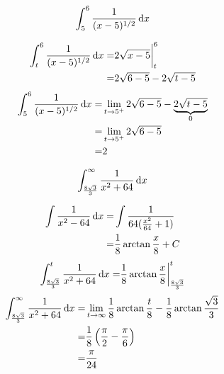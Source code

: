 \begin{ex}
  \[ \int^6_5 \frac{1}{(x-5)^{1/2}}\,\mathrm{d} x \]
  \begin{sol}
    \begin{align*}
      \int^6_t \frac{1}{(x-5)^{1/2}}\,\mathrm{d} x
      =& 2 \sqrt{x-5}\bigg|^6_t \\
      =& 2 \sqrt{6-5}-2\sqrt{t-5}
    \end{align*}
    \begin{align*}
      \int^6_5 \frac{1}{(x-5)^{1/2}}\,\mathrm{d} x
      =& \lim_{t \to 5^+} 2\sqrt{6-5}-\underbrace{2\sqrt{t-5}}_{0} \\
      =& \lim_{t \to 5^+} 2\sqrt{6-5}\\
      =& 2
    \end{align*}
  \end{sol}
\end{ex}
\begin{ex}
  \[ \int^\infty_{\frac{8\sqrt 3}{3}}\frac{1}{x^2+64}\,\mathrm{d} x \]
  \begin{sol}
    \begin{align*}
      \int \frac{1}{x^2-64}\,\mathrm{d} x
      =& \int \frac{1}{64(\frac{x^2}{64}+1)} \\
      =&\frac{1}{8}\arctan{\frac{x}{8}} + C
    \end{align*}
    \begin{align*}
      \int^t_{\frac{8\sqrt 3}{3}}\frac{1}{x^2+64}\,\mathrm{d} x
      =&\frac{1}{8}\arctan{\frac{x}{8}}\bigg|^t_{\frac{8\sqrt 3}{3}} \\
    \end{align*}
    \begin{align*}
      \int^\infty_{\frac{8\sqrt 3}{3}}\frac{1}{x^2+64}\,\mathrm{d} x
      =& \lim_{t \to \infty} \frac{1}{8}\arctan{\frac{t}{8}}-\frac{1}{8}\arctan{\frac{\sqrt 3}{3}} \\
      =& \frac{1}{8}\left(\frac{\pi}{2}-\frac{\pi}{6}\right) \\
      =& \frac{\pi}{24}
    \end{align*}
  \end{sol}
\end{ex}
